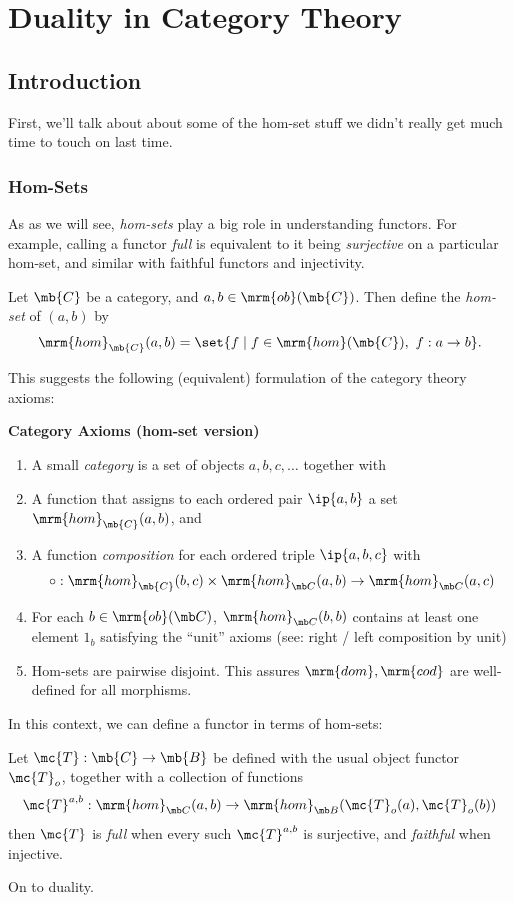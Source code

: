 \documentclass{fkbook}
\newcommand{\ob}{\mrm{ob}}
\newcommand{\homm}{\mrm{hom}}
\begin{document}
\chapter{Duality in Category Theory}
\begin{adjustwidth}{1em}{1em}
  \section{Introduction}
  First, we'll talk about about some of the hom-set stuff we didn't
  really get much time to touch on last time.
  \subsection{Hom-Sets}
  As as we will see, \emph{hom-sets} play a big role in understanding
  functors. For example, calling a functor \emph{full} is equivalent
  to it being \emph{surjective} on a particular hom-set, and similar
  with faithful functors and injectivity.
  \begin{definition}
    Let $\mb{C}$ be a category, and $a,b \in \ob(\mb{C})$. Then define
    the \emph{hom-set} of $(a,b)$ by
    \[
      \homm_{\mb{C}}(a,b) = \set{f \mid f \in \homm(\mb{C}),\ f : a
        \to b}.
    \]
  \end{definition}
  This suggests the following (equivalent) formulation of the category
  theory axioms:
  \begin{leftbar}
    {\large \bfseries Category Axioms (hom-set version)}
    \begin{enumerate}[label=(\roman*)]
      \item A small \emph{category} is a set of objects $a,b,c,\ldots$
        together with
      \item A function that assigns to each ordered pair $\ip{a,b}$ a
        set $\homm_{\mb{C}}(a,b)$, and
      \item A function \emph{composition} for each ordered triple
        $\ip{a,b,c}$ with
        \[
          \circ : \homm_{\mb{C}}(b,c) \times \homm_{\mb C}(a,b) \to
          \homm_{\mb C}(a,c)
        \]
      \item For each $b \in \ob(\mb C)$, $\homm_{\mb C}(b,b)$ contains
        at least one element $1_b$ satisfying the ``unit'' axioms
        (see: right / left composition by unit)
      \item Hom-sets are pairwise disjoint. This assures $\mrm{dom},
        \mrm{cod}$ are well-defined for all morphisms.
    \end{enumerate}
  \end{leftbar}
  In this context, we can define a functor in terms of hom-sets:
  \begin{definition}
    Let $\mc{T} : \mb{C} \to \mb{B}$ be defined with the usual object
    functor $\mc{T}_o$, together with a collection of functions
    \[
      \mc{T}^{a,b} : \homm_{\mb C}(a,b) \to \homm_{\mb B}(\mc{T}_o(a),
      \mc{T}_o(b))
    \]
    then $\mc{T}$ is \emph{full} when every such $\mc{T}^{a,b}$ is
    surjective, and \emph{faithful} when injective.
  \end{definition}
  On to duality.

\end{adjustwidth}
\end{document}
